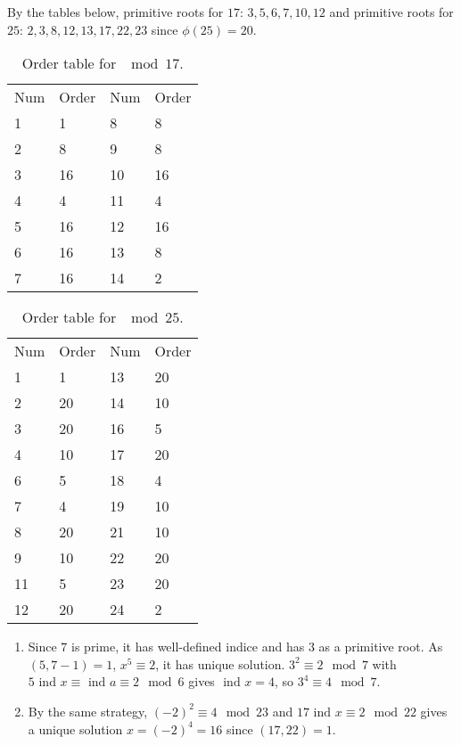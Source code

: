 \documentclass[12pt]{article}
\newenvironment{problem}[2][Problem]{\begin{trivlist}
\item[\hskip \labelsep {\bfseries #1}\hskip \labelsep {\bfseries #2.}]}{\end{trivlist}}
\begin{document}
\begin{problem}{3}
\end{problem}
By the tables below, primitive roots for $17$: $3,5,6,7,10,12$ and primitive roots for $25$: $2,3,8,12,13,17,22,23$ since $\phi(25)=20$.
\begin{table}[h]
\centering
\begin{tabular}{llll}
Num & Order & Num & Order \\
1   & 1     & 8   & 8     \\
2   & 8     & 9   & 8     \\
3   & 16    & 10  & 16    \\
4   & 4     & 11  & 4     \\
5   & 16    & 12  & 16    \\
6   & 16    & 13  & 8     \\
7   & 16    & 14  & 2    
\end{tabular}\caption{Order table for $\mod 17$.}
\end{table}
\begin{table}[h]
\centering
\begin{tabular}{llll}
Num & Order & Num & Order \\
1   & 1     & 13  & 20    \\
2   & 20    & 14  & 10    \\
3   & 20    & 16  & 5     \\
4   & 10    & 17  & 20    \\
6   & 5     & 18  & 4     \\
7   & 4     & 19  & 10    \\
8   & 20    & 21  & 10    \\
9   & 10    & 22  & 20    \\
11  & 5     & 23  & 20    \\
12  & 20    & 24  & 2    
\end{tabular}
\caption{Order table for $\mod 25$.}
\end{table}

\newpage
\begin{problem}{4}
\end{problem}
\begin{enumerate}
    \item[(i)] Since $7$ is prime, it has well-defined indice and has $3$ as a primitive root. As $(5,7-1)=1$, $x^5\equiv 2$, it has unique solution. $3^2\equiv 2 \mod 7$ with $5\textrm{ ind } x\equiv \textrm{ ind } a\equiv 2\mod 6$ gives $\textrm{ ind } x=4$, so $3^4\equiv 4\mod 7$.
    \item[(ii)] By the same strategy, $(-2)^2\equiv 4 \mod 23$ and $17\textrm{ ind } x\equiv 2\mod 22$ gives a unique solution $x=(-2)^4=16$ since $(17,22)=1$.
\end{enumerate}
\end{document}
